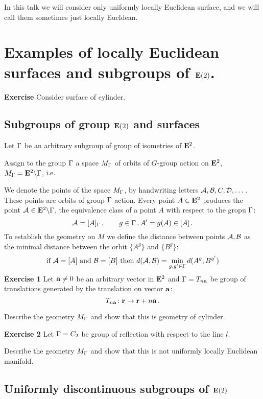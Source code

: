 \documentclass[12pt]{article}
\theoremstyle{definition}
\numberwithin{equation}{section}
\begin{document}
In this talk we will consider only uniformly locally 
Euclidean surface, and we will call them sometimes just
locally Eucldean.

   \section {Examples of locally Euclidean surfaces and 
subgroups of ${\bf E}(2)$.}

{\bf Exercise}  Consider surface of cylinder.  



\subsection{Subgroups of group ${\bf E}(2)$ and surfaces}

 
  Let ${\Gamma}$ be an arbitrary subgroup
of group of isometries of ${\bf E}^2$.


Assign to the group ${\Gamma}$ a
space $M_{\Gamma}$ of orbits of $G$-group action
on ${\bf E}^2$,
$M_{\Gamma}={\bf E}^2\backslash {\Gamma}$, i.e. 
           

 We denote the points of the space $M_{\Gamma}$, 
by handwriting letters ${\cal A},{\cal B},C,{\cal D},\dots$. These
points are orbits of group ${\Gamma}$ action.
Every  point $A\in {\bf E}^2$ produces the point
${\cal A}\in {\bf E}^2\backslash {\Gamma}$, the equivalence class
of a point $A$ with respect to the gropu ${\Gamma}$:
         $$
{\cal A}=[A]_{\Gamma}\,,\qquad  g\in {\Gamma}\,,
A'=g(A)\in [A]\,. 
        $$
To establish the geometry on $M$
we define the distance between points ${\cal A},{\cal B}$
as the minimal distance between the orbit
   $\{A^g\}$ and $\{B^g\}$:
            $$
\hbox{if ${\cal A}=[A]$ and ${\cal B}=[B]$ then}\,\,
d({\cal A},{\cal B})=\min_{g,g'\in{\Gamma}}d(A^g,B^{g'})
            $$ 
{\bf Exercise 1}  Let ${\bf a}\not=0$ be an arbitrary vector
in ${\bf E}^2$ and ${\Gamma}={T_{n{\bf a}}}$ be group of translations
generated by the translation on vector ${\bf a}$:
                 $$
T_{n{\bf a}}\colon {\bf r}\to {\bf r}+n{\bf a}\,.
                 $$

  Describe the geometry $M_{\Gamma}$
and show that this is geometry of cylinder.



\m

{\bf Exercise 2}  Let ${\Gamma}=C_2$ be group of reflection
with respect to the line $l$.

  Describe the geometry $M_{\Gamma}$
and show that this is not uniformly locally Euclidean manifold.

  



\subsection {Uniformly discontinuous subgroups of ${\bf E}(2)$}
\end{document}
